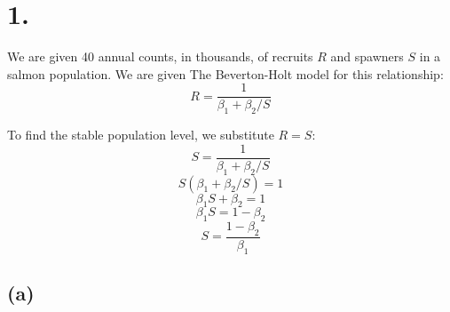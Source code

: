 \documentclass{article}
\begin{document}
\thispagestyle{firstpageheader}
{\Large 

\section*{1.}

We are given 40 annual counts, in thousands, of recruits \(R\) and spawners \(S\) in a salmon population. We are given The Beverton-Holt model for this relationship: 
\[
  R = \frac{1}{\beta_1 + \beta_2 / S}
\]

To find the stable population level, we substitute \(R = S\):
\[
  S = \frac{1}{\beta_1 + \beta_2 / S}
\]
\[
  S(\beta_1 + \beta_2 / S) = 1
\]
\[
  \beta_1S + \beta_2 = 1
\]
\[
  \beta_1S = 1 - \beta_2
\]
\[
  S = \frac{1 - \beta_2}{\beta_1}
\]

\subsection*{(a)}

}
\end{document}
